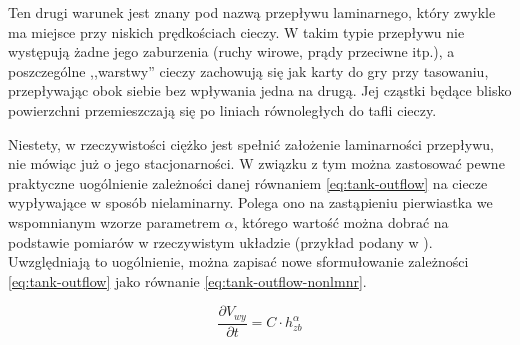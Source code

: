 Ten drugi warunek jest znany pod nazwą przepływu laminarnego, który zwykle ma miejsce przy niskich prędkościach cieczy. W takim typie przepływu nie występują żadne jego zaburzenia (ruchy wirowe, prądy przeciwne itp.), a poszczególne ,,warstwy'' cieczy zachowują się jak karty do gry przy tasowaniu, przepływając obok siebie bez wpływania jedna na drugą. Jej cząstki będące blisko powierzchni przemieszczają się po liniach równoległych do tafli cieczy.

Niestety, w rzeczywistości ciężko jest spełnić założenie laminarności przepływu, nie mówiąc już o jego stacjonarności. W związku z tym można zastosować pewne praktyczne uogólnienie zależności danej równaniem \ref{eq:tank-outflow} na ciecze wypływające w sposób nielaminarny. Polega ono na zastąpieniu pierwiastka we wspomnianym wzorze parametrem $\alpha$, którego wartość można dobrać na podstawie pomiarów w rzeczywistym układzie (przykład podany w \cite{TanksManual}). Uwzględniają to uogólnienie, można zapisać nowe sformułowanie zależności \ref{eq:tank-outflow} jako równanie \ref{eq:tank-outflow-nonlmnr}.

\begin{equation}\label{eq:tank-outflow-nonlmnr}
    \frac{\partial V_{wy}}{\partial t} = C\cdot h_{zb}^{\alpha}
\end{equation}
